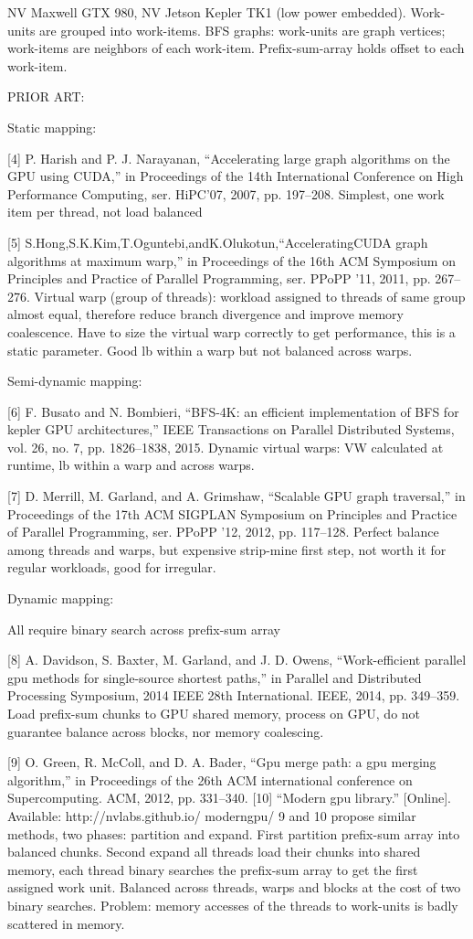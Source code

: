 \documentclass{article}
\begin{document}
NV Maxwell GTX 980, NV Jetson Kepler TK1 (low power embedded).
Work-units are grouped into work-items.
BFS graphs: work-units are graph vertices; work-items are neighbors of each work-item.
Prefix-sum-array holds offset to each work-item.


PRIOR ART:

Static mapping:


[4] P. Harish and P. J. Narayanan, “Accelerating large graph algorithms on the GPU using CUDA,” in Proceedings of the 14th International Conference on High Performance Computing, ser. HiPC’07, 2007, pp. 197–208. 
Simplest, one work item per thread, not load balanced

[5] S.Hong,S.K.Kim,T.Oguntebi,andK.Olukotun,“AcceleratingCUDA graph algorithms at maximum warp,” in Proceedings of the 16th ACM Symposium on Principles and Practice of Parallel Programming, ser. PPoPP ’11, 2011, pp. 267–276. 
Virtual warp (group of threads): workload assigned to threads of same group almost equal, therefore reduce branch divergence and improve memory coalescence.
Have to size the virtual warp correctly to get performance, this is a static parameter.
Good lb within a warp but not balanced across warps.

Semi-dynamic mapping:

[6] F. Busato and N. Bombieri, “BFS-4K: an efficient implementation of BFS for kepler GPU architectures,” IEEE Transactions on Parallel Distributed Systems, vol. 26, no. 7, pp. 1826–1838, 2015. 
Dynamic virtual warps: VW calculated at runtime, lb within a warp and across warps.

[7] D. Merrill, M. Garland, and A. Grimshaw, “Scalable GPU graph traversal,” in Proceedings of the 17th ACM SIGPLAN Symposium on Principles and Practice of Parallel Programming, ser. PPoPP ’12, 2012, pp. 117–128. 
Perfect balance among threads and warps, but expensive strip-mine first step, not worth it for regular workloads, good for irregular.

Dynamic mapping:

All require binary search across prefix-sum array

[8] A. Davidson, S. Baxter, M. Garland, and J. D. Owens, “Work-efficient parallel gpu methods for single-source shortest paths,” in Parallel and Distributed Processing Symposium, 2014 IEEE 28th International. IEEE, 2014, pp. 349–359. 
Load prefix-sum chunks to GPU shared memory, process on GPU, do not guarantee balance across blocks, nor memory coalescing.

[9] O. Green, R. McColl, and D. A. Bader, “Gpu merge path: a gpu merging algorithm,” in Proceedings of the 26th ACM international conference on Supercomputing. ACM, 2012, pp. 331–340. 
[10] “Modern gpu library.” [Online]. Available: http://nvlabs.github.io/ moderngpu/ 
9 and 10 propose similar methods, two phases: partition and expand.
First partition prefix-sum array into balanced chunks.
Second expand all threads load their chunks into shared memory, each thread binary searches the prefix-sum array to get the first assigned work unit.
Balanced across threads, warps and blocks at the cost of two binary searches.
Problem: memory accesses of the threads to work-units is badly scattered in memory.
\end{document}
